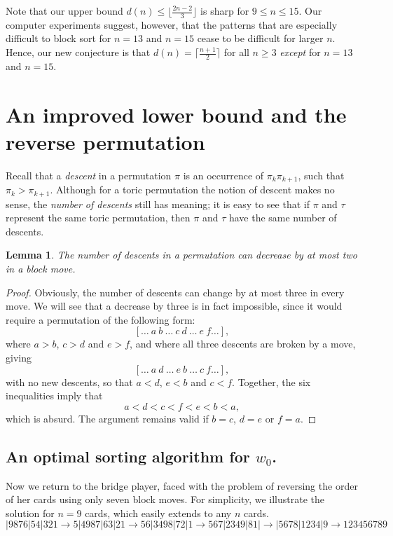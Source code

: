 \documentclass[11pt]{amsart} %
\newtheorem{lemma}[theorem]{Lemma}
\begin{document}
\noindent
Note that our upper bound $d(n) \le\lfloor\frac{2n-2}{3}\rfloor$ 
is sharp for $9\le n \le 15$.
Our computer experiments suggest, however, that the patterns that
are especially difficult to block sort for $n=13$ and $n=15$ cease to be
difficult for larger $n$.  Hence, our new conjecture is that
$d(n)=\lceil\frac{n+1}{2}\rceil$ for all $n\ge 3$ {\em except} for
$n=13$ and $n=15$.


\section{An improved lower bound and the reverse permutation}
\noindent
Recall that a {\em descent} in a permutation $\pi$ is an occurrence of
$\pi_k\pi_{k+1}$, such that  $\pi_k>\pi_{k+1}$. Although for a toric
permutation the notion of descent makes no sense, the {\em number of descents}
still has meaning; it is easy to see that if $\pi$ and $\tau$ represent the
same toric permutation, then  $\pi$ and $\tau$ have the same number of
descents.

\begin{lemma}  
The number of descents in a permutation can decrease by at most two in 
a block move.
\end{lemma}
\begin{proof}
Obviously, the number of descents can change by at most three in
every move.  We will see that a decrease by three is in fact impossible,
since it would require a permutation of the following form:
\[
   [\dots \ a\ b\ \dots \ c\ d\ \dots \ e\ f \dots],
\]
where $a>b$, $c>d$ and $e>f$, and where all three descents are broken
by a move, giving \vspace{-2mm}
\[
   [\dots \ a\ d\ \dots \ e\ b\ \dots \ c\ f \dots],
\]
with no new descents, so that $a<d$, $e<b$ and $c<f$.
Together, the six inequalities imply that \vspace{-1mm}
\[
   a < d < c < f < e < b < a,
\]
which is absurd. The argument remains valid if $b=c$, $d=e$ or $f=a$.
\end{proof}

\subsection{An optimal sorting algorithm for $w_0$.}
Now we return to the bridge player, faced with the problem of
reversing the order of her cards using only seven block moves. For
simplicity, we illustrate the solution for $n=9$ cards,
which easily extends to any $n$ cards. 
$ |9876|54|321 \!\rightarrow\! 5|4987|63|21 \!\rightarrow\! 
56|3498|72|1 \!\rightarrow\! 567|2349|81| \!\rightarrow\! 
|5678|1234|9 \!\rightarrow\! 123456789 $
\end{document}
